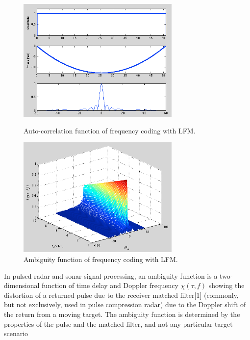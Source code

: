\documentclass{article}
\begin{document}
\begin{figure}[htb]
\begin{minipage}[t]{0.5\linewidth}
\centering
\includegraphics[width=8cm]{Figures/lfm_data.png}
\caption{Auto-correlation function of frequency coding with LFM.}
\label{fig:lfm_data}
\end{minipage}
\begin{minipage}[t]{0.5\linewidth}
\centering
\includegraphics[width=8cm]{Figures/lfm_3d.png}
\caption{Ambiguity function of frequency coding with LFM.}
\label{fig:lfm_3d}
\end{minipage}
\end{figure}
In pulsed radar and sonar signal processing, an ambiguity function is a two-dimensional function of time delay and Doppler frequency $\chi(\tau,f)$ showing the distortion of a returned pulse due to the receiver matched filter[1] (commonly, but not exclusively, used in pulse compression radar) due to the Doppler shift of the return from a moving target. The ambiguity function is determined by the properties of the pulse and the matched filter, and not any particular target scenario

\end{document}
